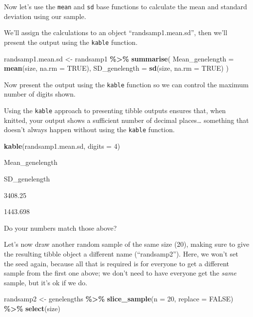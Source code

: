 \documentclass[
]{book}
\newenvironment{Shaded}{\begin{snugshade}}{\end{snugshade}}
\newcommand{\AttributeTok}[1]{\textcolor[rgb]{0.13,0.29,0.53}{#1}}
\newcommand{\ConstantTok}[1]{\textcolor[rgb]{0.56,0.35,0.01}{#1}}
\newcommand{\DecValTok}[1]{\textcolor[rgb]{0.00,0.00,0.81}{#1}}
\newcommand{\FunctionTok}[1]{\textcolor[rgb]{0.13,0.29,0.53}{\textbf{#1}}}
\newcommand{\NormalTok}[1]{#1}
\newcommand{\OtherTok}[1]{\textcolor[rgb]{0.56,0.35,0.01}{#1}}
\newcommand{\SpecialCharTok}[1]{\textcolor[rgb]{0.81,0.36,0.00}{\textbf{#1}}}
\begin{document}
Now let's use the \texttt{mean} and \texttt{sd} base functions to calculate the mean and standard deviation using our sample.

We'll assign the calculations to an object ``randsamp1.mean.sd'', then we'll present the output using the \texttt{kable} function.

\begin{Shaded}
\begin{Highlighting}[]
\NormalTok{randsamp1.mean.sd }\OtherTok{\textless{}{-}}\NormalTok{ randsamp1 }\SpecialCharTok{\%\textgreater{}\%}
  \FunctionTok{summarise}\NormalTok{(}
    \AttributeTok{Mean\_genelength =} \FunctionTok{mean}\NormalTok{(size, }\AttributeTok{na.rm =} \ConstantTok{TRUE}\NormalTok{),}
    \AttributeTok{SD\_genelength =} \FunctionTok{sd}\NormalTok{(size, }\AttributeTok{na.rm =} \ConstantTok{TRUE}\NormalTok{)}
\NormalTok{  )}
\end{Highlighting}
\end{Shaded}

Now present the output using the \texttt{kable} function so we can control the maximum number of digits shown.

Using the \texttt{kable} approach to presenting tibble outputs ensures that, when knitted, your output shows a sufficient number of decimal places\ldots{} something that doesn't always happen without using the \texttt{kable} function.

\begin{Shaded}
\begin{Highlighting}[]
\FunctionTok{kable}\NormalTok{(randsamp1.mean.sd, }\AttributeTok{digits =} \DecValTok{4}\NormalTok{)}
\end{Highlighting}
\end{Shaded}

Mean\_genelength

SD\_genelength

3408.25

1443.698

Do your numbers match those above?

Let's now draw another random sample of the same size (20), making sure to give the resulting tibble object a different name (``randsamp2''). Here, we won't set the seed again, because all that is required is for everyone to get a different sample from the first one above; we don't need to have everyone get the \emph{same} sample, but it's ok if we do.

\begin{Shaded}
\begin{Highlighting}[]
\NormalTok{randsamp2 }\OtherTok{\textless{}{-}}\NormalTok{ genelengths }\SpecialCharTok{\%\textgreater{}\%}
  \FunctionTok{slice\_sample}\NormalTok{(}\AttributeTok{n =} \DecValTok{20}\NormalTok{, }\AttributeTok{replace =} \ConstantTok{FALSE}\NormalTok{) }\SpecialCharTok{\%\textgreater{}\%}
  \FunctionTok{select}\NormalTok{(size)}
\end{Highlighting}
\end{Shaded}
\end{document}
